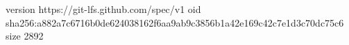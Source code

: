 version https://git-lfs.github.com/spec/v1
oid sha256:a882a7c6716b0de624038162f6aa9ab9c3856b1a42e169c42c7e1d3c70dc75c6
size 2892
